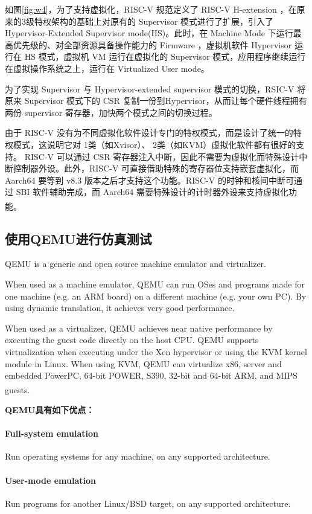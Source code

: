 \documentclass[UTF8,fontset=none,linespread=1.15]{ctexart}
\let\nosupcite\cite
\renewcommand*{\cite}[1]{\textsuperscript{\nosupcite{#1}}}
\begin{document}
如图\ref{fig:w4}，为了支持虚拟化，RISC-V 规范定义了 RISC-V H-extension ，在原来的3级特权架构的基础上对原有的 Supervisor 模式进行了扩展，引入了 Hypervisor-Extended Supervisor mode(HS)。此时，在 Machine Mode 下运行最高优先级的、对全部资源具备操作能力的 Firmware ，虚拟机软件 Hypervisor 运行在 HS 模式，虚拟机 VM 运行在虚拟化的 Supervisor 模式，应用程序继续运行在虚拟操作系统之上，运行在 Virtualized User mode。

为了实现 Supervisor 与 Hypervisor-extended supervisor 模式的切换，RSIC-V 将原来 Supervisor 模式下的 CSR 复制一份到Hypervisor，从而让每个硬件线程拥有两份 supervisor 寄存器，加快两个模式之间的切换过程。

由于 RISC-V 没有为不同虚拟化软件设计专门的特权模式，而是设计了统一的特权模式，这说明它对 1类（如Xvisor）、 2类（如KVM）虚拟化软件都有很好的支持。 RISC-V 可以通过 CSR 寄存器注入中断，因此不需要为虚拟化而特殊设计中断控制器外设。此外，RISC-V 可直接借助特殊的寄存器位支持嵌套虚拟化，而 Aarch64 要等到 v8.3 版本之后才支持这个功能。RISC-V 的时钟和核间中断可通过 SBI 软件辅助完成，而 Aarch64 需要特殊设计的计时器外设来支持虚拟化功能。\cite{d}

\subsection{使用QEMU进行仿真测试}

QEMU is a generic and open source machine emulator and virtualizer.

When used as a machine emulator, QEMU can run OSes and programs made for one machine (e.g. an ARM board) on a different machine (e.g. your own PC). By using dynamic translation, it achieves very good performance.

When used as a virtualizer, QEMU achieves near native performance by executing the guest code directly on the host CPU. QEMU supports virtualization when executing under the Xen hypervisor or using the KVM kernel module in Linux. When using KVM, QEMU can virtualize x86, server and embedded PowerPC, 64-bit POWER, S390, 32-bit and 64-bit ARM, and MIPS guests.\cite{1}

\textbf{QEMU具有如下优点：}

\paragraph{Full-system emulation}Run operating systems for any machine, on any supported architecture.

\paragraph{User-mode emulation}Run programs for another Linux/BSD target, on any supported architecture.
\end{document}
